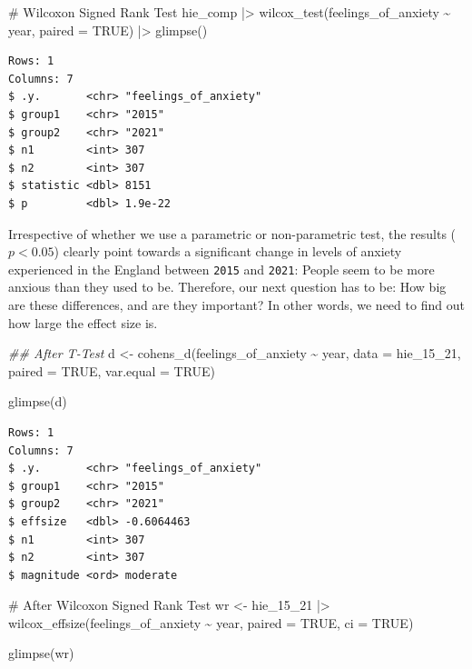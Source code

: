\documentclass[
  letterpaper,
  DIV=11,
  numbers=noendperiod]{scrreprt}
\newenvironment{Shaded}{\begin{snugshade}}{\end{snugshade}}
\newcommand{\AttributeTok}[1]{\textcolor[rgb]{0.40,0.45,0.13}{#1}}
\newcommand{\CommentTok}[1]{\textcolor[rgb]{0.37,0.37,0.37}{#1}}
\newcommand{\ConstantTok}[1]{\textcolor[rgb]{0.56,0.35,0.01}{#1}}
\newcommand{\DocumentationTok}[1]{\textcolor[rgb]{0.37,0.37,0.37}{\textit{#1}}}
\newcommand{\FunctionTok}[1]{\textcolor[rgb]{0.28,0.35,0.67}{#1}}
\newcommand{\NormalTok}[1]{\textcolor[rgb]{0.00,0.23,0.31}{#1}}
\newcommand{\OtherTok}[1]{\textcolor[rgb]{0.00,0.23,0.31}{#1}}
\newcommand{\SpecialCharTok}[1]{\textcolor[rgb]{0.37,0.37,0.37}{#1}}
\begin{document}
\begin{Shaded}
\begin{Highlighting}[]
\CommentTok{\# Wilcoxon Signed Rank Test}
\NormalTok{hie\_comp }\SpecialCharTok{|\textgreater{}}
  \FunctionTok{wilcox\_test}\NormalTok{(feelings\_of\_anxiety }\SpecialCharTok{\textasciitilde{}}\NormalTok{ year,}
              \AttributeTok{paired =} \ConstantTok{TRUE}\NormalTok{) }\SpecialCharTok{|\textgreater{}}
  \FunctionTok{glimpse}\NormalTok{()}
\end{Highlighting}
\end{Shaded}

\begin{verbatim}
Rows: 1
Columns: 7
$ .y.       <chr> "feelings_of_anxiety"
$ group1    <chr> "2015"
$ group2    <chr> "2021"
$ n1        <int> 307
$ n2        <int> 307
$ statistic <dbl> 8151
$ p         <dbl> 1.9e-22
\end{verbatim}

Irrespective of whether we use a parametric or non-parametric test, the
results (\(p < 0.05\)) clearly point towards a significant change in
levels of anxiety experienced in the England between \texttt{2015} and
\texttt{2021}: People seem to be more anxious than they used to be.
Therefore, our next question has to be: How big are these differences,
and are they important? In other words, we need to find out how large
the effect size is.

\begin{Shaded}
\begin{Highlighting}[]
\DocumentationTok{\#\# After T{-}Test}
\NormalTok{d }\OtherTok{\textless{}{-}} \FunctionTok{cohens\_d}\NormalTok{(feelings\_of\_anxiety }\SpecialCharTok{\textasciitilde{}}\NormalTok{ year,}
               \AttributeTok{data =}\NormalTok{ hie\_15\_21,}
               \AttributeTok{paired =} \ConstantTok{TRUE}\NormalTok{,}
               \AttributeTok{var.equal =} \ConstantTok{TRUE}\NormalTok{)}

\FunctionTok{glimpse}\NormalTok{(d)}
\end{Highlighting}
\end{Shaded}

\begin{verbatim}
Rows: 1
Columns: 7
$ .y.       <chr> "feelings_of_anxiety"
$ group1    <chr> "2015"
$ group2    <chr> "2021"
$ effsize   <dbl> -0.6064463
$ n1        <int> 307
$ n2        <int> 307
$ magnitude <ord> moderate
\end{verbatim}

\begin{Shaded}
\begin{Highlighting}[]
\CommentTok{\# After Wilcoxon Signed Rank Test}
\NormalTok{wr }\OtherTok{\textless{}{-}}
\NormalTok{  hie\_15\_21 }\SpecialCharTok{|\textgreater{}}
  \FunctionTok{wilcox\_effsize}\NormalTok{(feelings\_of\_anxiety }\SpecialCharTok{\textasciitilde{}}\NormalTok{ year,}
                   \AttributeTok{paired =} \ConstantTok{TRUE}\NormalTok{, }\AttributeTok{ci =} \ConstantTok{TRUE}\NormalTok{)}

\FunctionTok{glimpse}\NormalTok{(wr)}
\end{Highlighting}
\end{Shaded}
\end{document}
